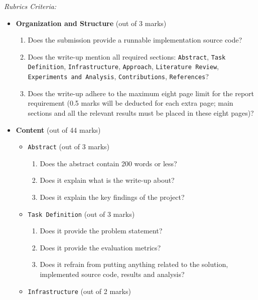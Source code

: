 \textit{Rubrics Criteria:}
\begin{itemize}
    \item \textbf{Organization and Structure} (out of 3 marks)
    \begin{enumerate}
        \item Does the submission provide a runnable implementation source code?
            \answerTODO{}
        \item Does the write-up mention all required sections: \texttt{Abstract}, \texttt{Task Definition}, \texttt{Infrastructure}, \texttt{Approach}, \texttt{Literature Review}, \texttt{Experiments and Analysis}, \texttt{Contributions}, \texttt{References}?
            \answerTODO{}
        \item Does the write-up adhere to the maximum eight page limit for the report requirement (0.5 marks will be deducted for each extra page; main sections and all the relevant results must be placed in these eight pages)?
            \answerTODO{}
    \end{enumerate}
    \item \textbf{Content} (out of 44 marks)
    \begin{itemize}
        \item \texttt{Abstract} (out of 3 marks)
        \begin{enumerate}
            \item Does the abstract contain 200 words or less?
                \answerTODO{}
            \item Does it explain what is the write-up about?
                \answerTODO{}
            \item Does it explain the key findings of the project?
                \answerTODO{} 
        \end{enumerate}
        \item \texttt{Task Definition} (out of 3 marks)
        \begin{enumerate}
            \item Does it provide the problem statement?
                \answerTODO{}
            \item Does it provide the evaluation metrics?
                \answerTODO{}
            \item Does it refrain from putting anything related to the solution, implemented source code, results and analysis?
                \answerTODO{}
        \end{enumerate}
        \item \texttt{Infrastructure} (out of 2 marks) 

\end{itemize}
\end{itemize}
